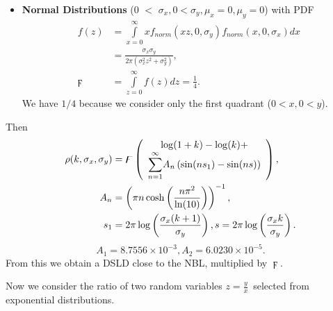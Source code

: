 \documentclass[titlepage,fleqn]{article}%
\begin{document}
\begin{itemize}
\item \textbf{Normal Distributions} ($0$%
$<$%
$\sigma_{x},0<\sigma_{y},\mu_{x}=0,\mu_{y}=0$) with PDF%
\begin{align*}
f(z)  &  =%
{\displaystyle\int\limits_{x=0}^{\infty}}
xf_{norm}(xz,0,\sigma_{y})f_{norm}(x,0,\sigma_{x})dx\\
&  =\frac{\sigma_{x}\sigma_{y}}{2\pi\left(  \sigma_{x}^{2}z^{2}+\sigma_{y}%
^{2}\right)  },\\
\digamma &  =%
{\displaystyle\int\limits_{z=0}^{\infty}}
f(z)dz=\frac{1}{4}.
\end{align*}
We have $1/4$ because we consider only the first quadrant ($0<x,0<y$).
\end{itemize}

Then%
\begin{align*}
\rho(k,\sigma_{x},\sigma_{y})  &  =\digamma\left(
\begin{array}
[c]{c}%
\log(1+k)-\log(k)+\\%
{\displaystyle\sum\limits_{n=1}^{\infty}}
A_{n}\left(  \sin(ns_{1}\right)  -\sin(ns))
\end{array}
\right)  ,\\
A_{n}  &  =\left(  \pi n\cosh\left(  \frac{n\pi^{2}}{\ln(10)}\right)  \right)
^{-1},\\
s_{1}  &  =2\pi\log\left(  \frac{\sigma_{x}(k+1)}{\sigma_{y}}\right)
,s=2\pi\log\left(  \frac{\sigma_{x}k}{\sigma_{y}}\right)  .
\end{align*}%
\[
A_{1}=8.7556\times10^{-3},A_{2}=6.0230\times10^{-5}.
\]
From this we obtain a DSLD close to the NBL, multiplied by $\digamma$.

Now we consider the ratio of two random variables $z=\frac{y}{x}$\ selected
from exponential distributions.
\end{document}
